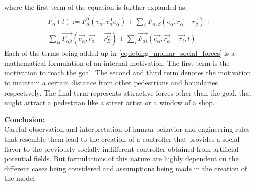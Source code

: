 where the first term of the equation is further expanded as:\\
\begin{multline}
\label{eq:lebing_molnar_social_forces}
\vec{F_{\alpha}}(t):=
\vec{F_{\alpha}^{0}}(\vec{v_{\alpha}}, v_{\alpha}^{0}\vec{e_{\alpha}})+\sum_{\beta}\vec{F_{\alpha, \beta}}(\vec{e_{\alpha}}, \vec{r_{\alpha}} - \vec{r_{\beta}})
+\\\sum_{B}\vec{F_{\alpha\beta}}(\vec{e_{\alpha}}, \vec{r_{\alpha}} - \vec{r_{B}^{\alpha}}) + \sum_{i}\vec{F_{\alpha i}}(\vec{e_{\alpha}}, \vec{r_{\alpha}}-\vec{r_i},t)
\end{multline}
Each of the terms being added up in \autoref{eq:lebing_molnar_social_forces} is a mathematical formulation of an internal motivation.
The first term is the motivation to reach the goal.
The second and third term denotes the motivation to maintain a certain distance from other pedestrians and boundaries respectively.
The final term represents attractive forces other than the goal, that might attract a pedestrian like a street artist or a window of a shop.
\par
\textbf{Conclusion:}\\
Careful observation and interpretation of human behavior and engineering rules that resemble them lead to the creation of a controller that provides a social flavor to the previously socially-indifferent controller obtained from artificial potential fields. But formulations of this nature are highly dependent on the different cases being considered and assumptions being made in the creation of the model


